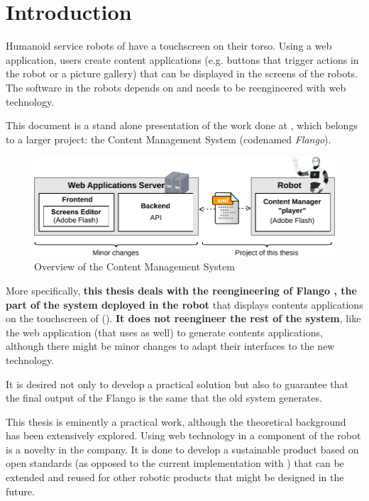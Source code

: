 \chapter{Introduction}

Humanoid service robots of \company have a touchscreen on their torso.
Using a web application, users create content applications (e.g. buttons that trigger actions in the robot or a picture gallery) that can be displayed in the screens of the robots.
The software in the robots depends on \flash and needs to be reengineered with web technology.

This document is a stand alone presentation of the work done at \company , which belongs to a larger project: the Content Management System (codenamed \textit{Flango}).
\begin{figure}[htb]
    \centering
    \includegraphics{figures/intro-system-overview.pdf}
    \caption{Overview of the Content Management System}
    \label{fig:intro-system-overview}
\end{figure}
More specifically, \textbf{this thesis deals with the reengineering of Flango \cm , the part of the system deployed \textbf{in the robot}} that displays contents applications on the touchscreen of  ().
\textbf{It does not reengineer the rest of the system}, like the web application (that uses \flash as well) to generate contents applications, although there might be minor changes to adapt their interfaces to the new technology.

It is desired not only to develop a practical solution but also to guarantee that the final output of the Flango \cm is the same that the old system generates.

This thesis is eminently a practical work, although the theoretical background has been extensively explored. 
Using web technology in a component of the robot is a novelty in the company. 
It is done to develop a sustainable product based on open standards (as opposed to the current implementation with \flash) that can be extended and reused for other robotic products that might be designed in the future.

